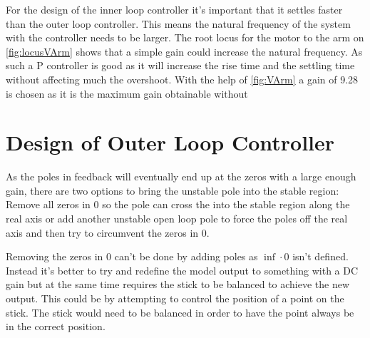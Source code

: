 For the design of the inner loop controller it's important that it settles faster than the outer loop controller. This means the natural frequency of the system with the controller needs to be larger. The root locus for the motor to the arm on \autoref{fig:locusVArm} shows that a simple gain could increase the natural frequency. As such a P controller is good as it will increase the rise time and the settling time without affecting much the overshoot. With the help of \autoref{fig:VArm} a gain of 9.28 is chosen as it is the maximum gain obtainable without 

%




\section{Design of Outer Loop Controller}
As the poles in feedback will eventually end up at the zeros with a large enough gain, there are two options to bring the unstable pole into the stable region: Remove all zeros in 0 so the pole can cross the into the stable region along the real axis or add another unstable open loop pole to force the poles off the real axis and then try to circumvent the zeros in 0. 

Removing the zeros in 0 can't be done by adding poles as $\inf\cdot0$ isn't defined. Instead it's better to try and redefine the model output to something with a DC gain but at the same time requires the stick to be balanced to achieve the new output. This could be by attempting to control the position of a point on the stick. The stick would need to be balanced in order to have the point always be in the correct position.


